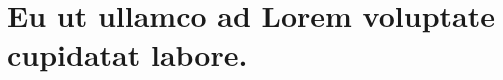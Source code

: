\documentclass[letterpaper, 12pt]{article}
\begin{document}
\section*{Eu ut ullamco ad Lorem voluptate cupidatat labore.}


\newpage

% 
\printbibliography
\end{document}
